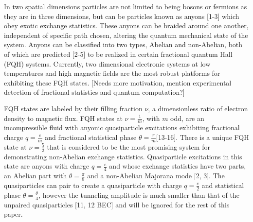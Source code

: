 \documentclass[]{article}
\title{}
\author{}
\begin{document}
\maketitle

\begin{abstract}

\end{abstract}
In two spatial dimensions particles are not limited to being bosons or fermions as they are in three dimensions, but can be particles known as anyons [1-3] which obey exotic exchange statistics. These anyons can be braided around one another, independent of specific path chosen, altering the quantum mechanical state of the system. Anyons can be classified into two types, Abelian and non-Abelian, both of which are predicted [2-5] to be realized in certain fractional quantum Hall (FQH) systems. Currently, two dimensional electronic systems at low temperatures and high magnetic fields are the most robust platforms for exhibiting these FQH states. [Needs more motivation, mention experimental detection of fractional statistics and quantum computation?]

FQH states are labeled by their filling fraction $\nu$, a dimensionless ratio of electron density to magnetic flux. FQH states at $\nu = \frac{1}{m}$, with $m$ odd, are an incompressible fluid with anyonic quasiparticle excitations exhibiting fractional charge $q = \frac{e}{m}$ and fractional statistical phase $\theta = \frac{\pi}{m}$[13-16]. There is a unique FQH state at $\nu = \frac{5}{2}$ that is considered to be the most promising system for demonstrating non-Abelian exchange statistics. Quasiparticle excitations in this state are anyons with charge $q = \frac{e}{4}$ and whose exchange statistics have two parts, an Abelian part with $\theta = \frac{\pi}{8}$ and a non-Abelian Majorana mode [2, 3]. The quasiparticles can pair to create a quasiparticle with charge $q = \frac{e}{2}$ and statistical phase $\theta = \frac{\theta}{4}$, however the tunneling amplitude is much smaller than that of the unpaired quasiparticles [11, 12 BEC] and will be ignored for the rest of this paper.
 
\end{document}
